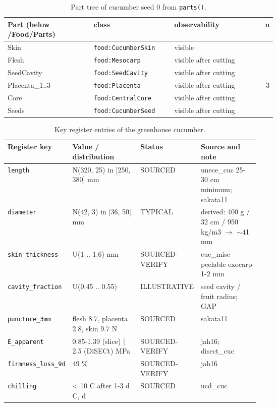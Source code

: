 \documentclass[10.5pt,a4paper]{article}
\begin{document}
\begin{table}[htbp]\centering\scriptsize\caption{Part tree of cucumber seed 0 from \texttt{parts()}.}
\begin{tabularx}{\linewidth}{@{}p{0.32\linewidth}p{0.3\linewidth}Xr@{}}\toprule Part (below /Food/Parts) & class & observability & n \\\midrule
\hspace*{0.0em}Skin & \texttt{food:CucumberSkin} & visible &  \\
\hspace*{0.0em}Flesh & \texttt{food:Mesocarp} & visible after cutting &  \\
\hspace*{0.0em}SeedCavity & \texttt{food:SeedCavity} & visible after cutting &  \\
\hspace*{0.9em}Placenta\_1..3 & \texttt{food:Placenta} & visible after cutting & 3 \\
\hspace*{0.9em}Core & \texttt{food:CentralCore} & visible after cutting &  \\
\hspace*{0.9em}Seeds & \texttt{food:CucumberSeed} & visible after cutting &  \\\bottomrule\end{tabularx}\end{table}
\begin{table}[htbp]\centering\scriptsize\caption{Key register entries of the greenhouse cucumber.}
\begin{tabularx}{\linewidth}{@{}p{0.19\linewidth}p{0.27\linewidth}p{0.12\linewidth}X@{}}\toprule Register key & Value / distribution & Status & Source and note \\\midrule
\texttt{length} & N(320, 25) in [250, 380] mm & SOURCED & unece\_cuc 25-30 cm minimum; sakata11 \\
\texttt{diameter} & N(42, 3) in [36, 50] mm & TYPICAL & derived: 400 g / 32 cm / 950 kg/m3 $\to$ $\sim$41 mm \\
\texttt{skin\_\allowbreak{}thickness} & U(1 .. 1.6) mm & SOURCED-VERIFY & cuc\_misc peelable exocarp 1-2 mm \\
\texttt{cavity\_\allowbreak{}fraction} & U(0.45 .. 0.55) & ILLUSTRATIVE & seed cavity / fruit radius; GAP \\
\texttt{puncture\_\allowbreak{}3mm} & flesh 8.7, placenta 2.8, skin 9.7 N & SOURCED & sakata11 \\
\texttt{E\_\allowbreak{}apparent} & 0.85-1.39 (slice) | 2.5 (DiSECt) MPa & SOURCED-VERIFY & jah16; disect\_cuc \\
\texttt{firmness\_\allowbreak{}loss\_\allowbreak{}9d} & 49 \% & SOURCED-VERIFY & jah16 \\
\texttt{chilling} & < 10 C after 1-3 d C, d & SOURCED & ucd\_cuc \\\bottomrule\end{tabularx}\end{table}
\end{document}
